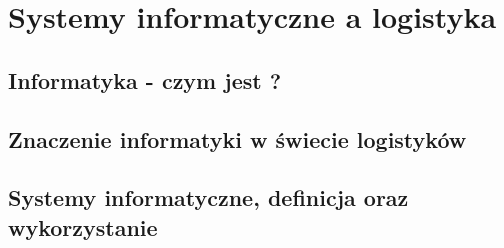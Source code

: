 \chapter{Systemy informatyczne a logistyka}
\label{c2:c2}

\section{Informatyka - czym jest ?}

\section{Znaczenie informatyki w świecie logistyków}

\section{Systemy informatyczne, definicja oraz wykorzystanie}